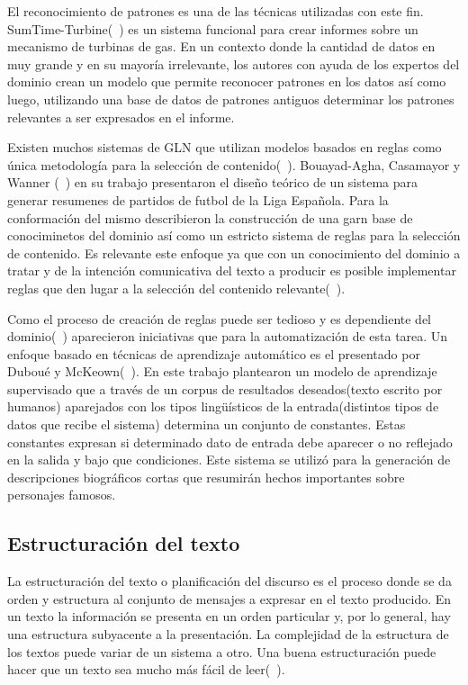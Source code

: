     El reconocimiento de patrones es una de las t\'ecnicas utilizadas con este fin.  SumTime-Turbine(~\cite{Yu2006ChoosingTC}) es un sistema funcional para crear
 informes sobre un mecanismo de turbinas de gas. En un contexto donde la cantidad de datos en muy grande y en su mayoría irrelevante, 
 los autores con ayuda de los expertos del dominio crean un modelo que permite reconocer patrones en los datos así como luego, utilizando una base de datos de patrones 
antiguos determinar los patrones relevantes a ser expresados en el informe. 

    Existen muchos sistemas de GLN que utilizan modelos basados en reglas como \'unica metodolog\'ia para la selecci\'on de contenido(~\cite{reiter_dale_2000,Perera2017RecentAI}). Bouayad-Agha, Casamayor y 
Wanner (~\cite{BouayadAgha2011ContentSF}) en su trabajo presentaron el dise\~no te\'orico de un sistema para generar resumenes de partidos de 
futbol de la Liga Espa\~nola. Para la conformaci\'on del mismo describieron la construcci\'on de una garn base de conociminetos del dominio as\'i como 
un estricto sistema de reglas para la selecci\'on de contenido. Es relevante este enfoque ya que con un conocimiento del dominio a tratar y de la intenci\'on comunicativa del texto a producir 
es posible implementar reglas que den lugar a la selección del contenido relevante(~\cite{Reiter1997BuildingAN,reiter_dale_2000}). 

    Como el proceso de creaci\'on de reglas puede ser tedioso y es dependiente del dominio(~\cite{Reiter1997BuildingAN}) aparecieron iniciativas que para la automatizaci\'on de esta tarea. Un enfoque 
basado en t\'ecnicas de aprendizaje autom\'atico es el presentado por Dubou\'e y McKeown(~\cite{Dubou2003StatisticalAO}). En este trabajo plantearon un modelo de aprendizaje supervisado que a trav\'es de
un corpus de resultados deseados(texto escrito por humanos) aparejados con los tipos lingüísticos de la entrada(distintos tipos de datos que recibe el sistema) determina un conjunto de constantes. Estas constantes 
expresan si determinado dato de entrada debe aparecer o no reflejado en la salida y bajo que condiciones. Este sistema se utilizó para la generación de descripciones biográficos cortas que resumirán hechos 
importantes sobre personajes famosos.

\subsection{Estructuración del texto}

    La estructuración del texto o planificación del discurso es el proceso donde se da orden y estructura al conjunto de mensajes a expresar en el texto producido. En un texto la información se presenta en un orden particular 
y, por lo general, hay una estructura subyacente a la presentación. La complejidad de la estructura de los textos puede variar de un sistema a otro. Una buena estructuración puede hacer que un texto sea mucho más fácil 
de leer(~\cite{Reiter1997BuildingAN}).

